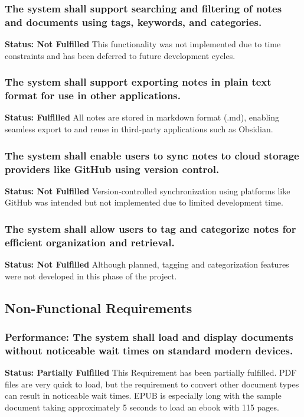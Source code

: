             \subsubsection {
            The system shall support searching and filtering of notes and documents using tags, keywords, and categories.}
            \textbf{Status: Not Fulfilled}  \newline
            This functionality was not implemented due to time constraints and has been deferred to future development cycles.
            
            
            \subsubsection {
            The system shall support exporting notes in plain text format for use in other applications.}
            \textbf{Status: Fulfilled}  \newline
            All notes are stored in markdown format (.md), enabling seamless export to and reuse in third-party applications such as Obsidian.
            
            
            \subsubsection {The system shall enable users to sync notes to cloud storage providers like GitHub using version control.}
            \textbf{Status: Not Fulfilled}  \newline
            Version-controlled synchronization using platforms like GitHub was intended but not implemented due to limited development time.

            
            \subsubsection {The system shall allow users to tag and categorize notes for efficient organization and retrieval.}
            \textbf{Status: Not Fulfilled}  \newline
            Although planned, tagging and categorization features were not developed in this phase of the project.
            


    \subsection{Non-Functional Requirements}
        \subsubsection { Performance: The system shall load and display documents without noticeable wait times on standard modern devices.}
        \textbf{Status: Partially Fulfilled}
        This Requirement has been partially fulfilled. PDF files are very quick to load, but the requirement to convert other document types can result in noticeable wait times. EPUB is especially long with the sample document taking approximately 5 seconds to load an ebook with 115 pages. 

